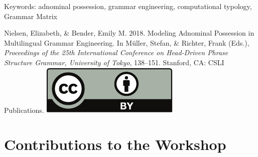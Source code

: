 \documentclass[11pt,a4paper,fleqn]{article}
\begin{document}
\noindent
Keywords: adnominal possession, grammar engineering, computational typology, Grammar Matrix


\vfill
\noindent
Nielsen, Elizabeth, \& Bender, Emily M. 2018. Modeling Adnominal Possession in Multilingual Grammar Engineering. In Müller, Stefan, \& Richter, Frank (Eds.), \emph{{Proceedings of the 25th International Conference on Head-Driven Phrase Structure Grammar, University of Tokyo}}, 138--151. Stanford,
CA: CSLI Publications. \hfill\href{http://creativecommons.org/licenses/by/4.0/}{\includegraphics[height=.75em]{Includes/ccby-eps-converted-to.pdf}}

\newpage

\part{Contributions to the Workshop}
\thispagestyle{empty}
\newpage
        \setcounter{page}{153}
\thispagestyle{empty}
\end{document}

